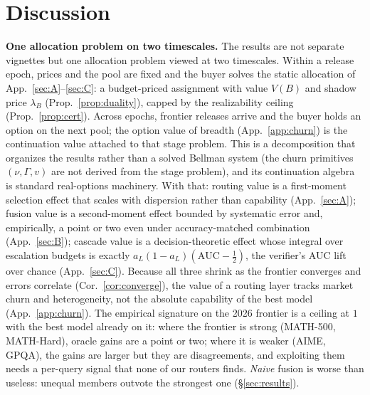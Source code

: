 \documentclass[11pt]{article}
\theoremstyle{plain}
\theoremstyle{definition}
\begin{document}
\section{Discussion}\label{sec:disc}
\textbf{One allocation problem on two timescales.} The results are not separate vignettes but one allocation problem viewed
at two timescales. Within a release epoch, prices and the pool are fixed and the buyer solves the static allocation of
App.~\ref{sec:A}--\ref{sec:C}: a budget-priced assignment with value $V(B)$ and shadow price $\lambda_B$ (Prop.~\ref{prop:duality}),
capped by the realizability ceiling (Prop.~\ref{prop:cert}). Across epochs, frontier releases arrive and the buyer holds an
option on the next pool; the option value of breadth (App.~\ref{app:churn}) is the continuation value attached to that stage
problem. This is a decomposition that organizes the results rather than a solved Bellman system (the churn primitives
$(\nu,\Gamma,v)$ are not derived from the stage problem), and its continuation algebra is standard real-options machinery. With that:
routing value is a first-moment selection effect that scales with dispersion rather than capability (App.~\ref{sec:A}); fusion value is a
second-moment effect bounded by systematic error and, empirically, a point or two even under accuracy-matched combination
(App.~\ref{sec:B});
cascade value is a decision-theoretic effect whose integral over escalation budgets is exactly $a_L(1-a_L)(\mathrm{AUC}-\tfrac12)$, the
verifier's AUC lift over chance (App.~\ref{sec:C}). Because all three
shrink as the frontier converges and errors correlate (Cor.~\ref{cor:converge}), the value of a routing layer tracks market churn and
heterogeneity, not the absolute capability of the best model (App.~\ref{app:churn}). The empirical signature on the 2026 frontier is a ceiling at $1$ with the best model already on it: where the frontier is
strong (MATH-500, MATH-Hard), oracle gains are a point or two; where it is weaker (AIME, GPQA), the gains are larger but they
are disagreements, and exploiting them needs a per-query signal that none of our routers finds. \emph{Naive} fusion is worse
than useless: unequal members outvote the strongest one (\S\ref{sec:results}).
\end{document}
